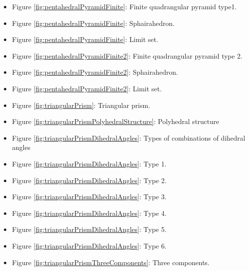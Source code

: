 \documentclass[suppldata, dvipdfmx]{interact}
\theoremstyle{plain}%
\theoremstyle{definition}
\theoremstyle{remark}
\theoremstyle{problemstyle}
\begin{document}
\begin{itemize}
\item Figure \ref{fig:pentahedralPyramidFinite}: Finite quadrangular pyramid
      type1.
\item Figure
      \ref{fig:pentahedralPyramidFinite}:
      Sphairahedron.
\item Figure
      \ref{fig:pentahedralPyramidFinite}:
      Limit set.

\item Figure \ref{fig:pentahedralPyramidFinite2}: Finite quadrangular pyramid
      type 2.
\item Figure
      \ref{fig:pentahedralPyramidFinite2}:
      Sphairahedron.
\item
     Figure \ref{fig:pentahedralPyramidFinite2}:
     Limit set.

\item Figure \ref{fig:triangularPrism}: Triangular prism.
\item Figure \ref{fig:triangularPrismPolyhedralStructure}: Polyhedral
      structure

\item Figure \ref{fig:triangularPrismDihedralAngles}: Types of
      combinations of dihedral angles
\item Figure
      \ref{fig:triangularPrismDihedralAngles}:
      Type 1.
\item Figure
      \ref{fig:triangularPrismDihedralAngles}:
      Type 2.
\item Figure
      \ref{fig:triangularPrismDihedralAngles}:
      Type 3.
\item Figure
      \ref{fig:triangularPrismDihedralAngles}:
      Type 4.
\item Figure
      \ref{fig:triangularPrismDihedralAngles}:
      Type 5.
\item Figure
      \ref{fig:triangularPrismDihedralAngles}:
      Type 6.

\item Figure \ref{fig:triangularPrismThreeComponents}: Three components.



\end{itemize}
\end{document}
